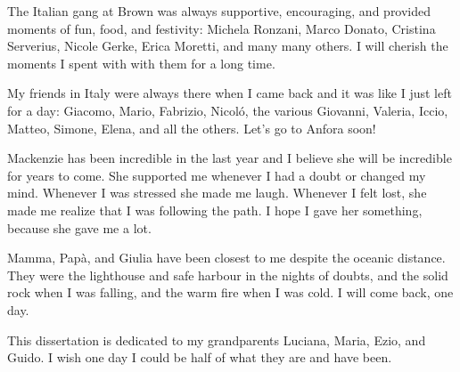 The Italian gang at Brown was always supportive, encouraging, and provided
moments of fun, food, and festivity: Michela Ronzani, Marco Donato, Cristina
Serverius, Nicole Gerke, Erica Moretti, and many many others. I will cherish the
moments I spent with with them for a long time.

My friends in Italy were always there when I came back and it was like I just
left for a day: Giacomo, Mario, Fabrizio, Nicol\'o, the various Giovanni,
Valeria, Iccio, Matteo, Simone, Elena, and all the others. Let's go to Anfora soon!

Mackenzie has been incredible in the last year and I believe she will be
incredible for years to come. She supported me whenever I had a doubt or changed
my mind. Whenever I was stressed she made me laugh. Whenever I felt lost, she
made me realize that I was following the path. I hope I gave her something,
because she gave me a lot.

Mamma, Pap\`a, and Giulia have been closest to me despite the oceanic distance.
They were the lighthouse and safe harbour in the nights of doubts, and the solid
rock when I was falling, and the warm fire when I was cold. I will come back,
one day.

This dissertation is dedicated to my grandparents Luciana, Maria, Ezio, and
Guido. I wish one day I could be half of what they are and have been.
\fi

